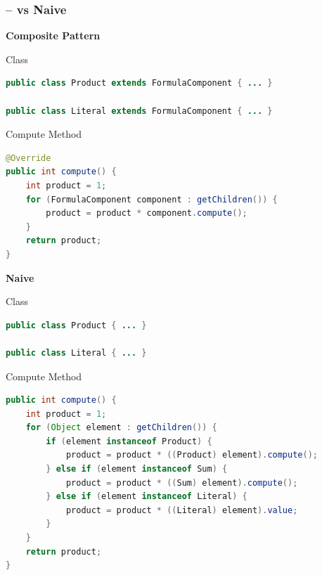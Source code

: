 \begin{frame}[fragile]
	\frametitle{\insertsubsection{} -- vs Naive}

	\begin{fancycolumns}[widths={50,50}, t]
		\centering \textbf{Composite Pattern}
		\begin{example}{Class}
			\vspace{-3mm}
			\begin{lstlisting}[language=Java, basicstyle=\small]
public class Product extends FormulaComponent { ... }

public class Literal extends FormulaComponent { ... }
			\end{lstlisting}
			\vspace{-3mm}
		\end{example}
		\begin{example}{Compute Method}
			\begin{lstlisting}[language=Java, basicstyle=\small]
@Override
public int compute() {
	int product = 1;
	for (FormulaComponent component : getChildren()) {
		product = product * component.compute();
	}
	return product;
}
			\end{lstlisting}
		\end{example}
		\nextcolumn
		\centering \textbf{Naive}
		\begin{example}{Class}
			\vspace{-3mm}
			\begin{lstlisting}[language=Java, basicstyle=\small]
public class Product { ... }

public class Literal { ... }
			\end{lstlisting}
			\vspace{-3mm}
		\end{example}
		\begin{example}{Compute Method}
			\vspace{-3mm}
			\begin{lstlisting}[language=Java, basicstyle=\small]
public int compute() {
	int product = 1;
	for (Object element : getChildren()) {
		if (element instanceof Product) {
			product = product * ((Product) element).compute();
		} else if (element instanceof Sum) {
			product = product * ((Sum) element).compute();
		} else if (element instanceof Literal) {
			product = product * ((Literal) element).value;
		}
	}
	return product;
}
		\end{lstlisting}
			\vspace{-3mm}
		\end{example}
	\end{fancycolumns}
\end{frame}

